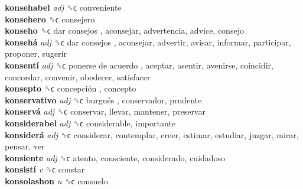 \textbf{konsehabel} \emph{adj}  ␝ϲ  conveniente  \\
\textbf{konsehero} ␝ϲ  consejero  \\
\textbf{konseho} ␝ϲ   dar consejos , aconsejar, advertencia, advice, consejo  \\
\textbf{konsehá} \emph{adj}  ␝ϲ   dar consejos , aconsejar, advertir, avisar, informar, participar, proponer, sugerir  \\
\textbf{konsentí} \emph{adj}  ␝ϲ   ponerse de acuerdo , aceptar, asentir, avenirse, coincidir, concordar, convenir, obedecer, satisfacer  \\
\textbf{konsepto} ␝ϲ   concepción , concepto  \\
\textbf{konservativo} \emph{adj}  ␝ϲ   burgués , conservador, prudente  \\
\textbf{konservá} \emph{adj}  ␝ϲ  conservar, llevar, mantener, preservar  \\
\textbf{konsiderabel} \emph{adj}  ␝ϲ  considerable, importante  \\
\textbf{konsiderá} \emph{adj}  ␝ϲ  considerar, contemplar, creer, estimar, estudiar, juzgar, mirar, pensar, ver  \\
\textbf{konsiente} \emph{adj}  ␝ϲ  atento, consciente, considerado, cuidadoso  \\
\textbf{konsistí} \emph{v}  ␝ϲ  constar  \\
\textbf{konsolashon} \emph{n}  ␝ϲ  consuelo  \\
